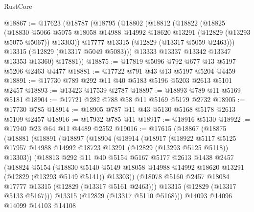 \begin{lexlean}{RustCore}
\begin{coremodule}
@18867 := @17623
    (@18787
      (@18795
        (@18802
          (@18812
            (@18822
              (@18825
                (@18830
                  @5066
                  @5075
                  @18058
                  @14988
                  @14992
                  @18620
                  @13291
                  (@12829 (@13293 @5075 @5067))
                  @13303))
              @17777
              @13315
              (@12829 (@13317 @5059 @2463)))
            @13315
            (@12829 (@13317 @5049 @5083)))
          @13333
          @13337
          @13342
          @13347
          @13353
          @13360)
        @17881))
@18875 := @17819 @5096 @792 @677 @13 @5197 @5206 @2463 @4477
@18881 := @17722 @791 @43 @13 @5197 @5204 @4459
@18891 := @17730 @789 @292 @11 @40 @5183 @5196 @5203 @2613 @5101 @2457
@18893 := @13423 @17539 @2787
@18897 := @18893 @789 @11 @5169 @5181
@18904 := @17721 @282 @788 @58 @11 @5169 @5179 @2732
@18905 := @17730 @785
@18914 := @18905 @787 @11 @43 @5130 @5168 @5178 @2613 @5109 @2457
@18916 := @17932 @785 @11
@18917 := @18916 @5130
@18922 := @17940 @23 @64 @11 @4489 @2552
@19016 := @17615
    (@18867
      (@18875
        (@18881
          (@18891
            (@18897
              (@18904
                (@18914
                  (@18917
                    (@18922
                      @5117
                      @5125
                      @17957
                      @14988
                      @14992
                      @18723
                      @13291
                      (@12829 (@13293 @5125 @5118))
                      @13303))
                  (@18813
                    @292
                    @11
                    @40
                    @5154
                    @5167
                    @5177
                    @2613
                    @1438
                    @2457
                    (@18824
                      @5154
                      (@18830
                        @5140
                        @5149
                        @18058
                        @14988
                        @14992
                        @18620
                        @13291
                        (@12829 (@13293 @5149 @5141))
                        @13303))
                    (@18078 @5160 @2457 @18084 @17777 @13315 (@12829 (@13317 @5161 @2463)))
                    @13315
                    (@12829 (@13317 @5133 @5167)))
                  @13315
                  (@12829 (@13317 @5110 @5168)))
                @14093
                @14096
                @14099
                @14103
                @14108

\end{coremodule}
\end{lexlean}
